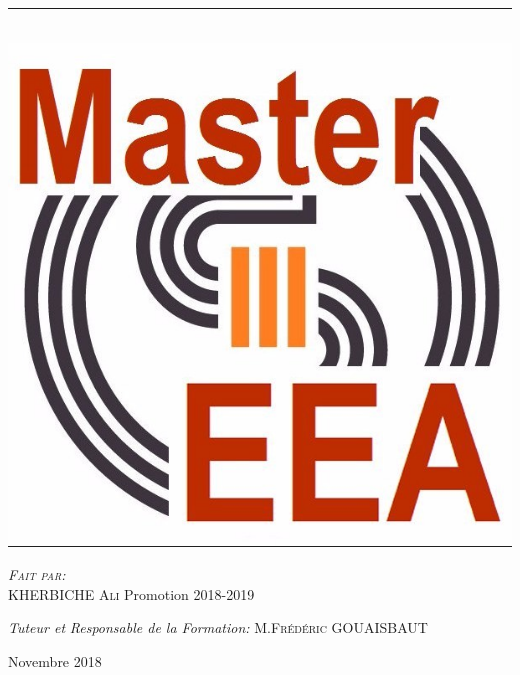 \documentclass[12pt, a4paper, openany]{report}
\newcommand{\HRule}{\rule{\linewidth}{0.5mm}}
\begin{document}
\begin{titlepage}
\begin{sffamily}
\begin{center}
    \HRule \\[1cm]   %
    \includegraphics[scale=0.1]{logomaster.jpg}
    \\[1cm]
    \begin{minipage}{0.4\textwidth}
      \begin{flushleft} \large
         \textsc{\emph {Fait par:} \\KHERBICHE Ali}  
          \newline
          Promotion 2018-2019 \\
      \end{flushleft}
    \end{minipage}
    \begin{minipage}{0.4\textwidth}
      \begin{flushright} \large
        \emph{Tuteur et}
        \emph{Responsable de la Formation:} \textsc{M.Frédéric GOUAISBAUT}
      \end{flushright}
    \end{minipage}
    \vfill
    {\large Novembre 2018}
  \end{center}
  \end{sffamily}                
  \end{titlepage}  
\makeatother
   
\renewcommand{\contentsname}{Sommaire}
\tableofcontents
\listoffigures
\listoftables

 
 

\end{document}
